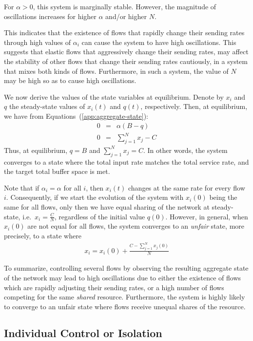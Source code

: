 \documentclass{article}
\begin{document}
For $\alpha > 0$, this system is marginally stable.
However,  the magnitude of oscillations increases for higher $\alpha$ and/or higher $N$.

This indicates that 
the existence of flows that
rapidly change their sending rates
through high values of $\alpha_i$ 
can cause the system to have high oscillations.
This suggests that elastic flows
that aggressively change their sending rates,
may affect the stability of other flows that
change their sending rates cautiously,
in a system that mixes both kinds of flows.
Furthermore, in such a system,
the value of $N$ may be high so as 
to cause high oscillations.

We now derive the values of the state variables
at equilibrium.
Denote by $x_i$ and
$q$ the steady-state values
of $x_i(t)$ and $q(t)$, respectively.
Then, at equilibrium, we have from Equations~(\ref{app:aggregate-state}):
\begin{eqnarray*}
0 &=&  \alpha (B - q)  \nonumber \\ 
0 &=&  \sum_{j=1}^{N} x_j - C 
\end{eqnarray*}
Thus, at equilibrium, $q = B$ and $\sum_{j=1}^{N} x_j = C$.
In other words,
the system converges to a state where
the total input rate matches the total service rate,
and the target total buffer space is met.

Note that if 
$\alpha_i = \alpha$ for all $i$,
then $x_i(t)$ changes at the same rate
for every flow $i$.
Consequently, if we start the evolution of
the system with $x_i(0)$ being the same
for all flows,
only then we have equal sharing of the network
at steady-state, i.e.\ $x_i = \frac{C}{N}$,
regardless of the initial value $q(0)$.
However, in general,
when $x_i(0)$ are not equal
for all flows,
the system converges to an {\em unfair} state,
more precisely, to a state where
\begin{eqnarray*}
x_i = x_i(0) + \frac{C - \sum_{j=1}^{N} x_j(0)}{N}
\end{eqnarray*}

To summarize,
controlling several flows 
by observing the resulting aggregate state of
the network may lead to high oscillations 
due to either
the existence of flows which
are rapidly adjusting their sending rates,
or a high number of flows competing
for the same {\em shared} resource.
Furthermore, 
the system is highly likely to converge to
an unfair state where flows receive
unequal shares of the resource.


\subsection{Individual Control or Isolation}
\label{sec:individual-control}
\end{document}
